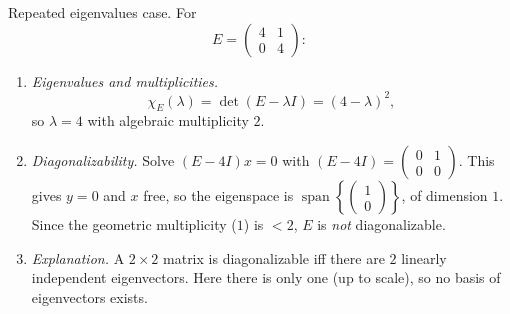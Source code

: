 \documentclass[11pt]{article}
\def\textbf#1{#1}%
\def\mathbf#1{#1}%
\begin{document}

\begin{solution}
\textbf{Repeated eigenvalues case.} For
\[
E=\begin{pmatrix}4&1\\[2pt]0&4\end{pmatrix}:
\]
\begin{enumerate}
\item \emph{Eigenvalues and multiplicities.}
\[
\chi_E(\lambda)=\det(E-\lambda I)=(4-\lambda)^2,
\]
so $\lambda=4$ with algebraic multiplicity $2$.

\item \emph{Diagonalizability.}
Solve $(E-4I)\mathbf{x}=\mathbf{0}$ with $(E-4I)=\begin{pmatrix}0&1\\[2pt]0&0\end{pmatrix}$.
This gives $y=0$ and $x$ free, so the eigenspace is
$\operatorname{span}\!\left\{\begin{pmatrix}1\\[2pt]0\end{pmatrix}\right\}$, of dimension $1$.
Since the geometric multiplicity ($1$) is $<2$, $E$ is \emph{not} diagonalizable.

\item \emph{Explanation.} A $2\times2$ matrix is diagonalizable iff there are $2$
linearly independent eigenvectors. Here there is only one (up to scale), so
no basis of eigenvectors exists.
\end{enumerate}
\end{solution}

\end{document}
